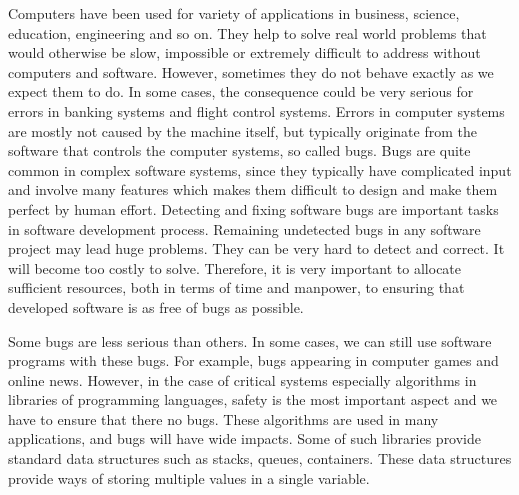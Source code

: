 \label{chapter:verification}

Computers have been used for variety of applications in business, science, education, engineering and so on. They help to solve real world problems that would otherwise be slow, impossible or extremely difficult to address without computers and software. However, sometimes they do not behave exactly as we expect them to do. In some cases, the consequence could be very serious for errors in banking systems
and flight control systems. Errors in computer systems are mostly not caused by the machine itself, but typically originate from the software that controls the computer systems, so called bugs. 
%
Bugs are quite common in complex software systems,
since they typically have complicated input and involve many features which makes them difficult to design and make them perfect by human effort.
%
Detecting and fixing software bugs are important tasks in software development process. Remaining undetected bugs in any software project may lead huge
problems. They can be very hard to detect and correct. It will
become too costly to solve. Therefore, it is very important to allocate sufficient
resources, both in terms of time and manpower, to ensuring that developed
software is as free of bugs as possible.

%
%
%

Some bugs are less serious than others. In some cases, we can still use software programs with these bugs. For example, bugs appearing in computer games and online news. However, in the case of critical systems 
especially algorithms in libraries of programming languages, safety is the most important aspect and we have to ensure that there no bugs. These algorithms are used in many applications, and bugs will have wide impacts. Some of such libraries provide standard data structures such as stacks, queues, containers. These data structures provide ways of storing multiple values in a single variable.

